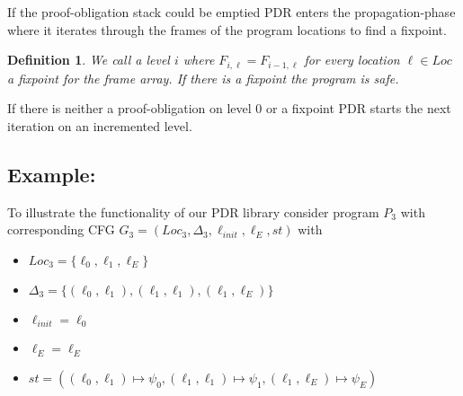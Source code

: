 \documentclass{article}
\newtheorem{mydef}{Definition}
\newcommand\mycom[1]{}
\newcommand\mycom[1]{#1}
\newcommand{\jw}[1]{\mycom{\todo[color=blue!40,inline]{\small JW: #1}}}
\begin{document}
	If the proof-obligation stack could be emptied PDR enters the propagation-phase where it iterates through the frames of the program locations to find a fixpoint. \\
	\begin{mydef}
		We call a level $i$ where $F_{i, \ell} = F_{i-1, \ell}$ for every location $\ell \in Loc$ a fixpoint for the frame array. If there is a fixpoint the program is safe.
	\end{mydef}
	If there is neither a proof-obligation on level 0 or a fixpoint PDR starts the next iteration on an incremented level.
	
	\jw{Say that the termvariables in the frames are being substituted by the in-variables of TF}
	
	\bigskip
	
	\subsection{Example:}
	To illustrate the functionality of our PDR library consider program $P_3$ with corresponding CFG $ G_3 = (Loc_3, \Delta_3, \ell_{init}, \ell_E, st) $ with \\ 
	\begin{itemize}
		\item $Loc_3 = \{\ell_0, \ell_1, \ell_E \}$
		\item $\Delta_3 = \{(\ell_0, \ell_1), (\ell_1, \ell_1), (\ell_1, \ell_E) \}$
		\item $\ell_{init} = \ell_0 $
		\item $\ell_E = \ell_E$
		\item $st = ( (\ell_0, \ell_1) \mapsto \psi_0, (\ell_1, \ell_1) \mapsto \psi_1, (\ell_1, \ell_E) \mapsto \psi_E)$
	\end{itemize}
\end{document}
